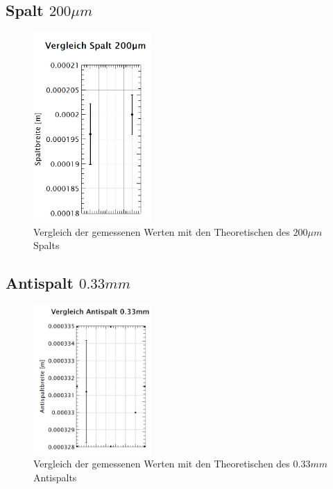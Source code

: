 \subsection*{Spalt $200\mu m$}
\begin{figure}[h!]
	\centering
	\includegraphics[width=0.4\textwidth]{data/dis_sp_200.png}
	\caption{Vergleich der gemessenen Werten mit den Theoretischen des $200\mu m$ Spalts}
	\label{fig:dis_spalt_200}
\end{figure}

\subsection*{Antispalt $0.33mm$}
\begin{figure}[h!]
	\centering
	\includegraphics[width=0.4\textwidth]{data/dis_asp_33.png}
	\caption{Vergleich der gemessenen Werten mit den Theoretischen des $0.33mm$ Antispalts}
	\label{fig:dis_aspalt_33}
\end{figure}


